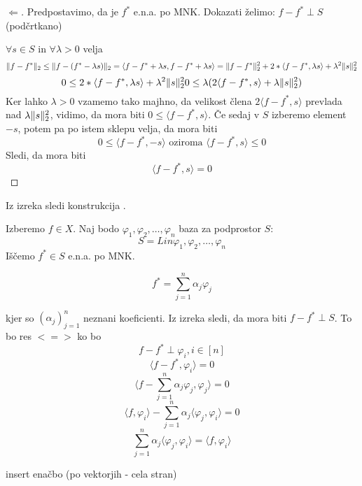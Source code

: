 \documentclass[a4paper,12pt]{article}
\DeclarePairedDelimiter\norm{\lVert}{\rVert}
\newcommand{\innerproduct}[2]{\langle #1, #2 \rangle}
\theoremstyle{definition}
\theoremstyle{remark}
\begin{document}
\begin{proof}[$\Longleftarrow$]
    Predpostavimo, da je $f^*$ e.n.a. po MNK.
    Dokazati želimo: $f - f^* \perp S$ (podčrtkano)

    $\forall s \in S \text{ in } \forall \lambda > 0$ velja
    \begin{equation}
        \norm{f - f^*}_2 \leq \norm{f - (f^* - \lambda s)}_2 = \innerproduct{f - f^* + \lambda s}{f - f^* + \lambda s} =
        \norm{f-f^*}_2^2 + 2 * \innerproduct{f - f^*}{\lambda s} + \lambda^2 \norm{s}_2^2
    \end{equation}
    \begin{equation}
        0 \leq 2 * \innerproduct{f - f^*}{\lambda s} + \lambda^2 \norm{s}_2^2\\
        0 \leq \lambda (2\innerproduct{f-f^*}{s} + \lambda \norm{s}_2^2)
    \end{equation}
    Ker lahko $\lambda > 0$ vzamemo tako majhno, da velikost člena $2\innerproduct{f-f^*}{s}$ prevlada nad $\lambda \norm{s}_2^2$, vidimo,
    da mora biti $0 \leq \innerproduct{f-f^*}{s}$. Če sedaj v $S$ izberemo element $-s$, potem pa po istem sklepu velja, da mora biti
    \begin{equation}
        0 \leq \innerproduct{f - f^*}{-s} \text{ oziroma } \innerproduct{f - f^*}{s} \leq 0
    \end{equation}
    Sledi, da mora biti
    \begin{equation}
        \innerproduct{f - f^*}{s} = 0
    \end{equation}
\end{proof}

Iz izreka sledi konstrukcija .

Izberemo $f \in X$. Naj bodo $\varphi_1, \varphi_2, \dots, \varphi_n$ baza za podprostor $S$:
\[S = Lin{\varphi_1, \varphi_2, \dots, \varphi_n}\]
Iščemo $f^* \in S$ e.n.a. po MNK.

\[f^* = \sum_{j = 1}^{n} \alpha_j \varphi_j\]

kjer so $(\alpha_j)_{j = 1}^n$ neznani koeficienti. Iz izreka sledi, da mora biti $f - f^* \perp S$. To bo res $<=>$ ko bo
\[f - f^* \perp \varphi_i, i \in [n]\]
\[\innerproduct{f - f^*}{\varphi_i} = 0\]
\[\innerproduct{f - \sum_{j = 1}^{n}\alpha_j \varphi_j}{\varphi_j} = 0\]
\[\innerproduct{f}{\varphi_i} - \sum_{j = 1}^{n}\alpha_j \innerproduct{\varphi_j}{\varphi_i} = 0\]
\[\sum_{j = 1}^{n} \alpha_j \innerproduct{\varphi_j}{\varphi_i} = \innerproduct{f}{\varphi_i}\]

insert enačbo (po vektorjih - cela stran)
\end{document}
